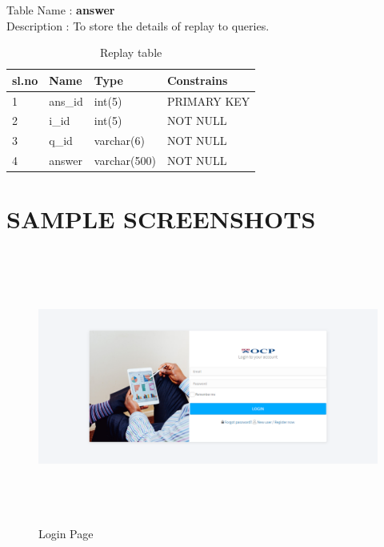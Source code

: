 \begin{table}[!h]
Table Name    :    {\bf answer}\\
Description      :  To store the details of replay to queries.


\begin{tabular}{|l|l|l|l|}
\hline
\bf sl.no & \bf Name    & \bf Type         & \bf Constrains  \\ 
\hline
1     & ans\_id & int(5)       & PRIMARY KEY \\ 
\hline
2     & i\_id   & int(5)       &        NOT NULL     \\ 
\hline
3     & q\_id   & varchar(6)   &     NOT NULL        \\ 
\hline
4     & answer  & varchar(500) & NOT NULL            \\ 
\hline
\end{tabular}
\caption{Replay table}
\end{table}

%
%
%
\chapter{SAMPLE SCREENSHOTS}
%
\begin{figure}[!h]
	\begin{center}
		\includegraphics[height=9cm,width=15cm]{login.png}
	\end{center}
\caption{Login Page}
\end{figure}

